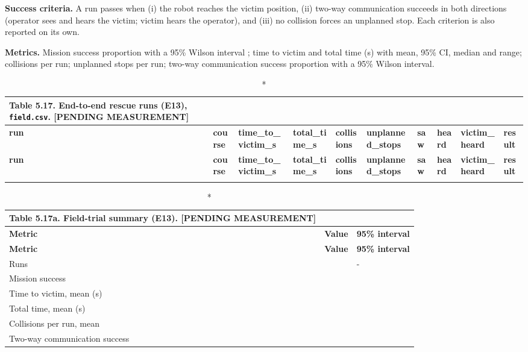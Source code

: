 \textbf{Success criteria.} A run passes when (i) the robot reaches the victim position, (ii) two-way communication succeeds in both directions (operator sees and hears the victim; victim hears the operator), and (iii) no collision forces an unplanned stop. Each criterion is also reported on its own.

\textbf{Metrics.} Mission success proportion with a 95\% Wilson interval \cite{wilson1927}; time to victim and total time (s) with mean, 95\% CI, median and range; collisions per run; unplanned stops per run; two-way communication success proportion with a 95\% Wilson interval.

\begin{center}
\tiny
\begin{longtable}{|p{0.6cm}|p{1.0cm}|p{1.6cm}|p{1.3cm}|p{1.0cm}|p{1.8cm}|p{0.7cm}|p{0.8cm}|p{1.6cm}|p{0.9cm}|}
\caption*{Table 5.17. End-to-end rescue runs (E13), \texttt{field.csv}. [PENDING MEASUREMENT]}
\addcontentsline{lot}{table}{\protect\numberline{5.17}End-to-end rescue runs (E13), \texttt{field.csv}. [PENDING MEASUREMENT]}
\\
\hline
\textbf{run} & \textbf{course} & \textbf{time\_to\_victim\_s} & \textbf{total\_time\_s} & \textbf{collisions} & \textbf{unplanned\_stops} & \textbf{saw} & \textbf{heard} & \textbf{victim\_heard} & \textbf{result} \\
\hline
\endfirsthead
\hline
\textbf{run} & \textbf{course} & \textbf{time\_to\_victim\_s} & \textbf{total\_time\_s} & \textbf{collisions} & \textbf{unplanned\_stops} & \textbf{saw} & \textbf{heard} & \textbf{victim\_heard} & \textbf{result} \\
\hline
\endhead
 & & & & & & & & & \\
\hline
\end{longtable}
\end{center}

\begin{center}
\begin{longtable}{|p{5cm}|l|l|}
\caption*{Table 5.17a. Field-trial summary (E13). [PENDING MEASUREMENT]}
\addcontentsline{lot}{table}{\protect\numberline{5.17a}Field-trial summary (E13). [PENDING MEASUREMENT]}
\\
\hline
\textbf{Metric} & \textbf{Value} & \textbf{95\% interval} \\
\hline
\endfirsthead
\hline
\textbf{Metric} & \textbf{Value} & \textbf{95\% interval} \\
\hline
\endhead
Runs & & - \\
\hline
Mission success & & \\
\hline
Time to victim, mean (s) & & \\
\hline
Total time, mean (s) & & \\
\hline
Collisions per run, mean & & \\
\hline
Two-way communication success & & \\
\hline
\end{longtable}
\end{center}

